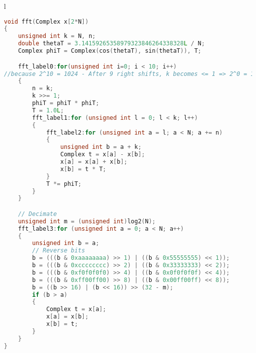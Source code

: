 \begin{table}[!h]
\centering
\caption{Radix-2 DIF FFT}
\label{fhewcode3:CTfft}
\begin{tabular}{l}
\toprule
\begin{lstlisting}[columns=fullflexible, language=C++,escapechar=\$]
void fft(Complex x[2*N])
{
	unsigned int k = N, n;
	double thetaT = 3.14159265358979323846264338328L / N;
	Complex phiT = Complex(cos(thetaT), sin(thetaT)), T;

	fft_label0:for(unsigned int i=0; i < 10; i++) 
//because 2^10 = 1024 - After 9 right shifts, k becomes <= 1 => 2^0 = 1
	{
		n = k;
		k >>= 1;
		phiT = phiT * phiT;
		T = 1.0L;
		fft_label1:for (unsigned int l = 0; l < k; l++)
		{
			fft_label2:for (unsigned int a = l; a < N; a += n)
			{
				unsigned int b = a + k;
				Complex t = x[a] - x[b];
				x[a] = x[a] + x[b];
				x[b] = t * T;
			}
			T *= phiT;
		}
	}

	// Decimate
	unsigned int m = (unsigned int)log2(N);
	fft_label3:for (unsigned int a = 0; a < N; a++)
	{
		unsigned int b = a;
		// Reverse bits
		b = (((b & 0xaaaaaaaa) >> 1) | ((b & 0x55555555) << 1));
		b = (((b & 0xcccccccc) >> 2) | ((b & 0x33333333) << 2));
		b = (((b & 0xf0f0f0f0) >> 4) | ((b & 0x0f0f0f0f) << 4));
		b = (((b & 0xff00ff00) >> 8) | ((b & 0x00ff00ff) << 8));
		b = ((b >> 16) | (b << 16)) >> (32 - m);
		if (b > a)
		{
			Complex t = x[a];
			x[a] = x[b];
			x[b] = t;
		}
	}
}
\end{lstlisting}
\\
\bottomrule
\end{tabular}
\end{table}